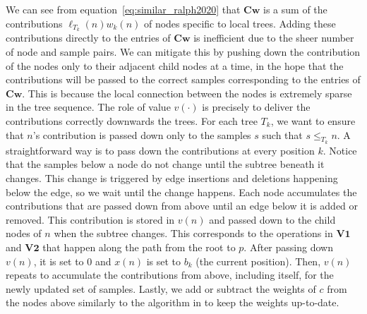We can see from equation~\eqref{eq:similar_ralph2020} that $\mathbf{C}\mathbf{w}$ is
a sum of the contributions $\ell_{T_k}(n)w_k(n)$ of nodes specific to local trees.
Adding these contributions directly to the entries of $\mathbf{C}\mathbf{w}$ is
inefficient due to the sheer number of node and sample pairs.
We can mitigate this by pushing down the contribution of the nodes only to their adjacent child nodes at a time,
in the hope that the contributions will be passed to the correct samples corresponding to the entries of $\mathbf{C}\mathbf{w}$.
This is because the local connection between the nodes is extremely sparse in the tree sequence.
The role of value $v(\cdot)$ is precisely to deliver the contributions correctly downwards the trees.
For each tree $T_k$, we want to ensure that $n$'s contribution is passed down only to
the samples $s$ such that $s \le_{T_k} n$.
A straightforward way is to pass down the contributions at every position $k$.
Notice that the samples below a node do not change until the subtree beneath it changes.
This change is triggered by edge insertions and deletions happening below the edge,
so we wait until the change happens.
Each node accumulates the contributions that are passed down from above
until an edge below it is added or removed.
This contribution is stored in $v(n)$ and passed down to the child nodes of $n$ when the subtree changes.
This corresponds to the operations in $\mathbf{V1}$ and $\mathbf{V2}$
that happen along the path from the root to $p$.
After passing down $v(n)$, it is set to $0$ and $x(n)$ is set to $b_k$ (the current position).
Then, $v(n)$ repeats to accumulate the contributions from above, including itself,
for the newly updated set of samples.
Lastly, we add or subtract the weights of $c$ from the nodes above similarly to
the algorithm in \citet{ralph2020efficiently} to keep the weights up-to-date.


